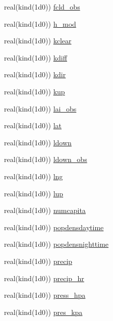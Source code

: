 \begin{DoxyCompactItemize}
real(kind(1d0)) \hyperlink{namespacedata__in_a03109ad2e583af2eb4b59e2e95758a72}{fcld\+\_\+obs}
\item 
real(kind(1d0)) \hyperlink{namespacedata__in_aaa77ae828595f5b1e1bec4237020dfbc}{h\+\_\+mod}
\item 
real(kind(1d0)) \hyperlink{namespacedata__in_ab31fbd3fd9d4036fa930706c4de36397}{kclear}
\item 
real(kind(1d0)) \hyperlink{namespacedata__in_ab7baf80fc15ebb7a7b739d064226a548}{kdiff}
\item 
real(kind(1d0)) \hyperlink{namespacedata__in_a4e6bf95c9d5bb3ea152dc358ac818008}{kdir}
\item 
real(kind(1d0)) \hyperlink{namespacedata__in_a5d9f4f79563d2e000333219a4d2f4c99}{kup}
\item 
real(kind(1d0)) \hyperlink{namespacedata__in_af9683d39e50e85ff167afd46236c7643}{lai\+\_\+obs}
\item 
real(kind(1d0)) \hyperlink{namespacedata__in_a364ff1ce2a4c78ea431e4dacbd66d6b4}{lat}
\item 
real(kind(1d0)) \hyperlink{namespacedata__in_a7be43e97ab4efa32b57c8f6b6b5949b7}{ldown}
\item 
real(kind(1d0)) \hyperlink{namespacedata__in_ad5a6e580db1d91b3cbb617a2bbee8d93}{ldown\+\_\+obs}
\item 
real(kind(1d0)) \hyperlink{namespacedata__in_a3604b533bd06593307e185fbbee27efb}{lng}
\item 
real(kind(1d0)) \hyperlink{namespacedata__in_a5a2c23ecc11fe337a954cca86be6e0ce}{lup}
\item 
real(kind(1d0)) \hyperlink{namespacedata__in_a6121773c8a8acb40d4c9501422264e15}{numcapita}
\item 
real(kind(1d0)) \hyperlink{namespacedata__in_a444b978c1a82b3eac7148ef35e9769c9}{popdensdaytime}
\item 
real(kind(1d0)) \hyperlink{namespacedata__in_a6b29a851fa3dca9d854a9078a37ad349}{popdensnighttime}
\item 
real(kind(1d0)) \hyperlink{namespacedata__in_affc86dfcf91974ff6d1768ff3b4406c3}{precip}
\item 
real(kind(1d0)) \hyperlink{namespacedata__in_aa3e790835200b911e51eba62d37a0c43}{precip\+\_\+hr}
\item 
real(kind(1d0)) \hyperlink{namespacedata__in_a03eea39f7275fe19868636524b857b6d}{press\+\_\+hpa}
\item 
real(kind(1d0)) \hyperlink{namespacedata__in_a63dc6d1a7d5f10b5c3ebd45aaffb7150}{pres\+\_\+kpa}
\item 

\end{DoxyCompactItemize}
